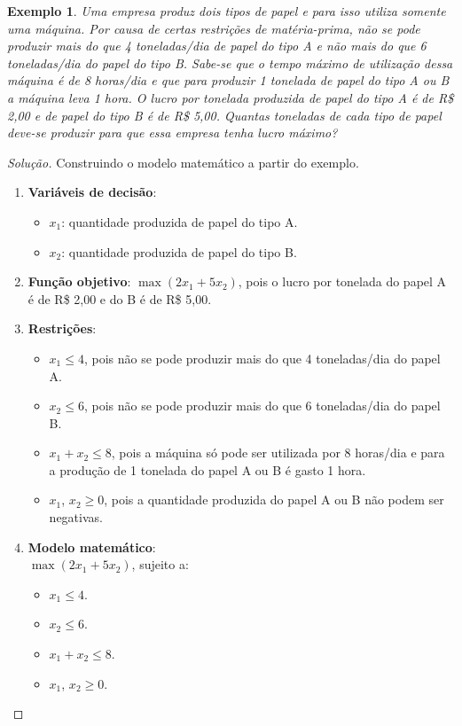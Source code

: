 \documentclass[
	12pt,				%
	openright,			%
	twoside,			%
	a4paper,			%
	english,			%
	french,				%
	brazil,				%
	sumario=tradicional
]{abntex2}
\newtheorem{example}{Exemplo}
\newenvironment{solution}{
	\begin{proof}[Solução]
}{\end{proof}}
\numberwithin{example}{chapter}
\numberwithin{remark}{chapter}
\numberwithin{definition}{chapter}
\numberwithin{figure}{chapter}
\begin{document}
\begin{example}
	\label{example:prog_lin:papelAB}
    Uma empresa produz dois tipos de papel e para isso utiliza somente uma máquina. Por causa de certas restrições de matéria-prima, não se pode produzir mais do que 4 toneladas/dia de papel do tipo A e não mais do que 6 toneladas/dia do papel do tipo B. Sabe-se que o tempo máximo de utilização dessa máquina é de 8 horas/dia e que para produzir 1 tonelada de papel do tipo A ou B a máquina leva 1 hora. O lucro por tonelada produzida de papel do tipo A é de R\$ 2,00 e de papel do tipo B é de R\$ 5,00. Quantas toneladas de cada tipo de papel deve-se produzir para que essa empresa tenha lucro máximo?
\end{example}

\begin{solution}
	Construindo o modelo matemático a partir do exemplo.\hfill
    \begin{enumerate}
        \item \textbf{Variáveis de decisão}:\hfill
            \begin{itemize}
                \item $x_1$: quantidade produzida de papel do tipo A.
                \item $x_2$: quantidade produzida de papel do tipo B.
            \end{itemize}

        \item \textbf{Função objetivo}:\hfill
            $\max (2x_1 + 5x_2)$, pois o lucro por tonelada do papel A é de R\$ 2,00 e do B é de R\$ 5,00.

        \item \textbf{Restrições}:\hfill
            \begin{itemize}
                \item $x_1 \leqslant 4$, pois não se pode produzir mais do que 4 toneladas/dia do papel A.
                \item $x_2 \leqslant 6$, pois não se pode produzir mais do que 6 toneladas/dia do papel B.
                \item $x_1 + x_2 \leqslant 8$, pois a máquina só pode ser utilizada por 8 horas/dia e para a produção de 1 tonelada do papel A ou B é gasto 1 hora.
                \item $x_1$, $x_2 \geqslant 0$, pois a quantidade produzida do papel A ou B não podem ser negativas.
            \end{itemize}

        \item \textbf{Modelo matemático}:\\
            $\max (2x_1 + 5x_2)$, sujeito a:
            \begin{itemize}
                \item $x_1 \leqslant 4$.
                \item $x_2 \leqslant 6$.
                \item $x_1 + x_2 \leqslant 8$.
                \item $x_1$, $x_2 \geqslant 0$.
            \end{itemize}
    \end{enumerate}
    

\end{solution}
\end{document}

